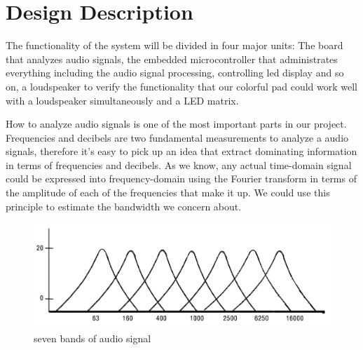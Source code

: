 \documentclass[12pt,a4paper,journal]{IEEEtran}
\begin{document}
\section{Design Description}

The functionality of the system will be divided in four major units: The board that analyzes audio signals, the embedded microcontroller that administrates everything including the audio signal processing, controlling led display and so on, a loudspeaker to verify the functionality that our colorful pad could work well with a loudspeaker simultaneously and a LED matrix.

How to analyze audio signals is one of the most important parts in our project. Frequencies and decibels are two fundamental measurements to analyze a audio signals, therefore it's easy to pick up an idea that extract dominating information in terms of frequencies and decibels. As we know, any actual time-domain signal could be expressed into frequency-domain using the Fourier transform in terms of the amplitude of each of the frequencies that make it up. We could use this principle to estimate the bandwidth we concern about.
\begin{figure}[ht]
  \centering
  \includegraphics[width=0.9\linewidth]{frequencyaudio.png}
  \caption{seven bands of audio signal}
  \label{fig:fras}
\end{figure}
\end{document}
